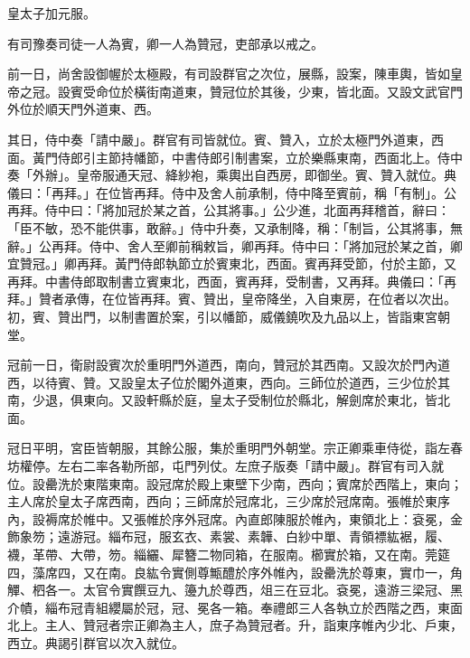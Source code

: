 \begin{pinyinscope}
 皇太子加元服。



 有司豫奏司徒一人為賓，卿一人為贊冠，吏部承以戒之。



 前一日，尚舍設御幄於太極殿，有司設群官之次位，展縣，設案，陳車輿，皆如皇帝之冠。設賓受命位於橫街南道東，贊冠位於其後，少東，皆北面。又設文武官門外位於順天門外道東、西。



 其日，侍中奏「請中嚴」。群官有司皆就位。賓、贊入，立於太極門外道東，西面。黃門侍郎引主節持幡節，中書侍郎引制書案，立於樂縣東南，西面北上。侍中奏「外辦」。皇帝服通天冠、絳紗袍，乘輿出自西房，即御坐。賓、贊入就位。典儀曰：「再拜。」在位皆再拜。侍中及舍人前承制，侍中降至賓前，稱「有制」。公再拜。侍中曰：「將加冠於某之首，公其將事。」公少進，北面再拜稽首，辭曰：「臣不敏，恐不能供事，敢辭。」侍中升奏，又承制降，稱：「制旨，公其將事，無辭。」公再拜。侍中、舍人至卿前稱敕旨，卿再拜。侍中曰：「將加冠於某之首，卿宜贊冠。」卿再拜。黃門侍郎執節立於賓東北，西面。賓再拜受節，付於主節，又再拜。中書侍郎取制書立賓東北，西面，賓再拜，受制書，又再拜。典儀曰：「再拜。」贊者承傳，在位皆再拜。賓、贊出，皇帝降坐，入自東房，在位者以次出。初，賓、贊出門，以制書置於案，引以幡節，威儀鐃吹及九品以上，皆詣東宮朝堂。



 冠前一日，衛尉設賓次於重明門外道西，南向，贊冠於其西南。又設次於門內道西，以待賓、贊。又設皇太子位於閣外道東，西向。三師位於道西，三少位於其南，少退，俱東向。又設軒縣於庭，皇太子受制位於縣北，解劍席於東北，皆北面。



 冠日平明，宮臣皆朝服，其餘公服，集於重明門外朝堂。宗正卿乘車侍從，詣左春坊權停。左右二率各勒所部，屯門列仗。左庶子版奏「請中嚴」。群官有司入就位。設罍洗於東階東南。設冠席於殿上東壁下少南，西向；賓席於西階上，東向；主人席於皇太子席西南，西向；三師席於冠席北，三少席於冠席南。張帷於東序內，設褥席於帷中。又張帷於序外冠席。內直郎陳服於帷內，東領北上：袞冕，金飾象笏；遠游冠。緇布冠，服玄衣、素裳、素韡、白紗中單、青領褾紘裾，履、襪，革帶、大帶，笏。緇纚、犀簪二物同箱，在服南。櫛實於箱，又在南。莞筵四，藻席四，又在南。良紘令實側尊甒醴於序外帷內，設罍洗於尊東，實巾一，角觶、柶各一。太官令實饌豆九、籩九於尊西，俎三在豆北。袞冕，遠游三梁冠、黑介幘，緇布冠青組纓屬於冠，冠、冕各一箱。奉禮郎三人各執立於西階之西，東面北上。主人、贊冠者宗正卿為主人，庶子為贊冠者。升，詣東序帷內少北、戶東，西立。典謁引群官以次入就位。




\end{pinyinscope}
